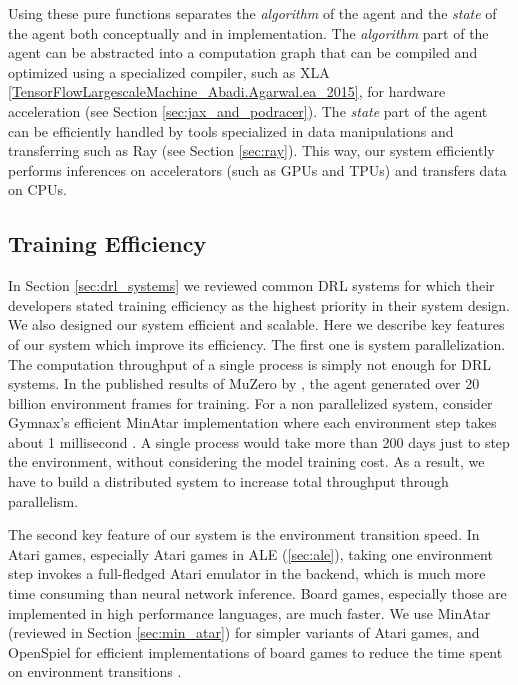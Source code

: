 Using these pure functions separates the \textit{algorithm} of the agent and the \textit{state} of the agent both conceptually and in implementation.
The \textit{algorithm} part of the agent can be abstracted into a computation graph that can be compiled and optimized using a specialized compiler, such as XLA \ref{TensorFlowLargescaleMachine_Abadi.Agarwal.ea_2015}, for hardware acceleration (see Section \ref{sec:jax_and_podracer}).
The \textit{state} part of the agent can be efficiently handled by tools specialized in data manipulations and transferring such as Ray (see Section \ref{sec:ray}).
This way, our system efficiently performs inferences on accelerators (such as GPUs and TPUs) and transfers data on CPUs.

\subsection{Training Efficiency}
In Section \ref{sec:drl_systems} we reviewed common DRL systems for which their developers stated training efficiency as the highest priority in their system design.
We also designed our system efficient and scalable.
Here we describe key features of our system which improve its efficiency.
The first one is system parallelization.
The computation throughput of a single process is simply not enough for DRL systems.
In the published results of MuZero by \cite{MasteringAtariGo_Schrittwieser.Antonoglou.ea_2020}, the agent generated over 20 billion environment frames for training.
For a non parallelized system, consider Gymnax's efficient MinAtar implementation where each environment step takes about 1 millisecond \cite{GymnaxJAXbasedReinforcement_RobertTjarkoLange_2022}.
A single process would take more than 200 days just to step the environment, without considering the model training cost.
As a result, we have to build a distributed system to increase total throughput through parallelism.

The second key feature of our system is the environment transition speed.
In Atari games, especially Atari games in ALE (\ref{sec:ale}), taking one environment step invokes a full-fledged Atari emulator in the backend, which is much more time consuming than neural network inference.
Board games, especially those are implemented in high performance languages, are much faster.
We use MinAtar (reviewed in Section \ref{sec:min_atar}) for simpler variants of Atari games, and OpenSpiel for efficient implementations of board games to reduce the time spent on environment transitions \cite{OpenSpielFrameworkReinforcement_Lanctot.Lockhart.ea_2020,MinAtarAtariInspiredTestbed_Young.Tian_2019}.

